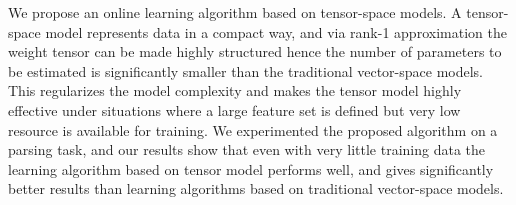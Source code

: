We propose an online learning algorithm based on tensor-space models. A tensor-space model represents data in a compact way, and via rank-1 approximation the weight tensor can be made highly structured hence the number of parameters to be estimated is significantly smaller than the traditional vector-space models. This regularizes the model complexity and makes the tensor model highly effective under situations where a large feature set is defined but very low resource is available for training. We experimented the proposed algorithm on a parsing task, and our results show that even with very little training data the learning algorithm based on tensor model performs well, and gives significantly better results than learning algorithms based on traditional vector-space models.
